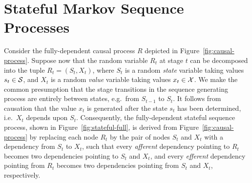 \documentclass[a4paper]{article}
\begin{document}
\section{Stateful Markov Sequence Processes}
Consider the fully-dependent causal process $R$ depicted in Figure~\ref{fig:causal-process}.
Suppose now that the random variable $R_t$ at stage $t$ can be decomposed into the tuple
$R_t=(S_t,X_t)$, where $S_t$ is a random {\em state} variable taking values $s_t\in{\cal S}$, and $X_t$
is a random {\em value} variable taking values $x_t\in{\cal X}$.
We make the common presumption that the stage transitions in the sequence generating process are entirely between states, e.g.\ from $S_{t-1}$ to $S_t$.
It follows from causation that the value $x_t$ is generated after the state $s_t$ has been determined, i.e.\ $X_t$ depends upon $S_t$.
Consequently, the fully-dependent  stateful sequence process, shown in Figure~\ref{fig:stateful-full}, is derived from Figure~\ref{fig:causal-process}
by replacing each node $R_t$ by the pair of nodes $S_t$ and $X_t$ with a dependency from $S_t$ to $X_t$, such that every {\em afferent} dependency pointing to $R_t$ becomes two dependencies pointing to $S_t$ and $X_t$, and every {\em efferent} dependency pointing from $R_t$ becomes two dependencies pointing from $S_t$ and $X_t$, respectively.
\end{document}
